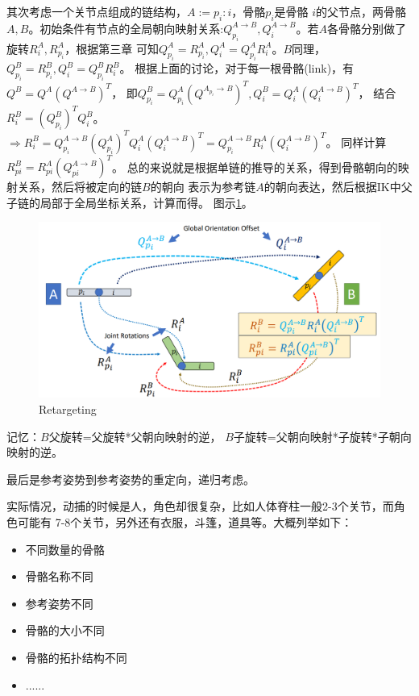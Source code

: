 \documentclass[lang=cn,newtx,10pt,scheme=chinese]{elegantbook}
\begin{document}
其次考虑一个关节点组成的链结构，$A:= p_i : i$，骨骼$p_i$是骨骼
$i$的父节点，两骨骼$A,B$。初始条件有节点的全局朝向映射关系:$Q^{A\rightarrow B}_{p_i},
Q^{A\rightarrow B}_{i}$。若$A$各骨骼分别做了旋转$R_i ^A, R^A_{p_i}$，根据第三章
可知$Q_{p_i}^A = R_{p_i}^A, Q_i ^A = Q^A _{p_i}R^A _i$。$B$同理，
$Q_{p_i}^B = R_{p_i}^B, Q_i ^B = Q^B _{p_i}R^B _i$。
根据上面的讨论，对于每一根骨骼(link)，有$Q^B = Q^A(Q^{A\rightarrow B})^T$，
即$Q^B _{p_i} = Q^A _{p_i}(Q^{A_{p_i}\rightarrow B})^T, Q^B _i= Q^A _i(Q^{A\rightarrow B} _i)^T$，
结合$R_i ^B = (Q_{p_i}^B)^T Q_i ^B$。$\Rightarrow R_i ^B = 
Q_{p_i}^{A \rightarrow B}\left(Q_{p_i}^A\right)^T Q_i^A\left(Q_i^{A \rightarrow B}\right)^T=
Q_{p_i}^{A \rightarrow B} R_i^A\left(Q_i^{A \rightarrow B}\right)^T$。
同样计算$R_{p i}^B=R_{p i}^A\left(Q_{p i}^{A \rightarrow B}\right)^T$。
总的来说就是根据单链的推导的关系，得到骨骼朝向的映射关系，然后将被定向的链$B$的朝向
表示为参考链$A$的朝向表达，然后根据IK中父子链的局部于全局坐标关系，计算而得。
图示\ref{fig:Retargeting}。
\begin{figure}[htbp]
  \centering
  \includegraphics[totalheight=2in]{"./image/Retargeting.png"}
  \caption{Retargeting} \label{fig:Retargeting}
\end{figure}

记忆：$B$父旋转=父旋转*父朝向映射的逆， $B$子旋转=父朝向映射*子旋转*子朝向映射的逆。

最后是参考姿势到参考姿势的重定向，递归考虑。

实际情况，动捕的时候是人，角色却很复杂，比如人体脊柱一般2-3个关节，而角色可能有
7-8个关节，另外还有衣服，斗篷，道具等。大概列举如下：
\begin{itemize}
  \setlength{\itemindent}{2em}
  \item 不同数量的骨骼
  \item 骨骼名称不同
  \item 参考姿势不同
  \item 骨骼的大小不同
  \item 骨骼的拓扑结构不同
  \item ......
\end{itemize}
\end{document}
